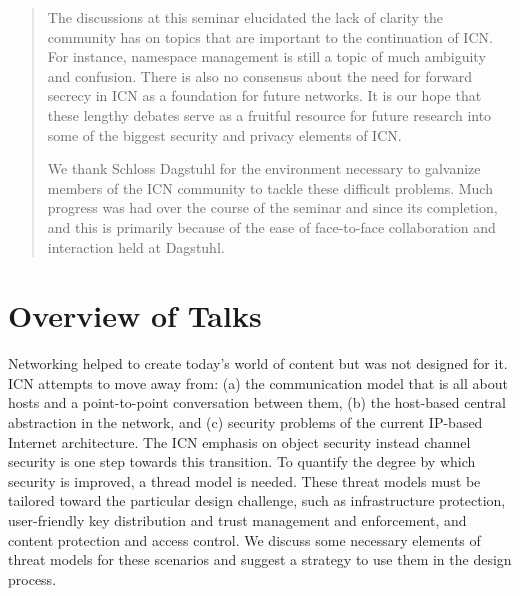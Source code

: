 \documentclass[a4paper,UKenglish]{dagrep}
\begin{document}
\begin{abstract}
The discussions at this seminar elucidated the lack of clarity the community has on topics that are important to the continuation of ICN. For instance, namespace management is still a topic of much ambiguity and confusion. There is also no consensus about the need for forward secrecy in ICN as a foundation for future networks. It is our hope that these lengthy debates serve as a fruitful resource for future research into some of the biggest security and privacy elements of ICN. 

We thank Schloss Dagstuhl for the environment necessary to galvanize members of the ICN community to tackle these difficult problems. Much progress was had over the course of the seminar and since its completion, and this is primarily because of the ease of face-to-face collaboration and interaction held at Dagstuhl.
\end{abstract}

\tableofcontents


\section{Overview of Talks}

\license

Networking helped to create today's world of content but was not designed for it. ICN attempts to move away from: (a) the communication model that is all about hosts and a point-to-point conversation between them, (b) the host-based central abstraction in the network, and (c) security problems of the current IP-based Internet architecture. The ICN emphasis on object security instead channel security is one step towards this transition. To quantify the degree by which security is improved, a thread model is needed. These threat models must be tailored toward the particular design challenge, such as infrastructure protection, user-friendly key distribution and trust management and enforcement, and content protection and access control. We discuss some necessary elements of threat models for these scenarios and suggest a strategy to use them in the design process.

\license
\end{document}
